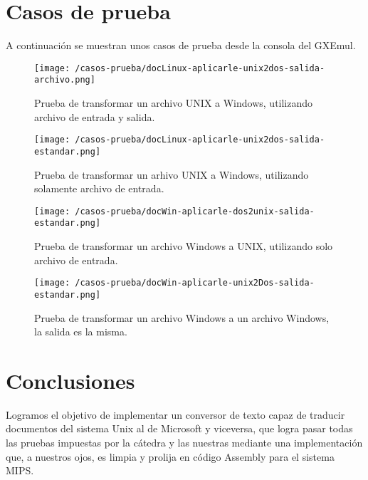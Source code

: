 \documentclass[a4paper]{article}
\begin{document}
\section{Casos de prueba}

A continuación se muestran unos casos de prueba desde la consola del GXEmul.


\begin{figure}[!htp]
\begin{center}
\texttt{[image: /casos-prueba/docLinux-aplicarle-unix2dos-salida-archivo.png]}
\caption{Prueba de transformar un archivo UNIX a Windows, utilizando archivo de entrada y salida.} \label{fig001}
\end{center}
\end{figure}

\begin{figure}[!htp]
\begin{center}
\texttt{[image: /casos-prueba/docLinux-aplicarle-unix2dos-salida-estandar.png]}
\caption{Prueba de transformar un arhivo UNIX a Windows, utilizando solamente archivo de entrada.} \label{fig001}
\end{center}
\end{figure}

\begin{figure}[!htp]
\begin{center}
\texttt{[image: /casos-prueba/docWin-aplicarle-dos2unix-salida-estandar.png]}
\caption{Prueba de transformar un archivo Windows a UNIX, utilizando solo archivo de entrada.} \label{fig001}
\end{center}
\end{figure}

\begin{figure}[!htp]
\begin{center}
\texttt{[image: /casos-prueba/docWin-aplicarle-unix2Dos-salida-estandar.png]}
\caption{Prueba de transformar un archivo Windows a un archivo Windows, la salida es la misma.} \label{fig001}
\end{center}
\end{figure}

\pagebreak


\section{Conclusiones}

Logramos el objetivo de implementar un conversor de texto capaz de traducir documentos del sistema Unix al de Microsoft y viceversa, que logra pasar todas las pruebas impuestas por la cátedra y las nuestras mediante una implementación que, a nuestros ojos, es limpia y prolija en código Assembly para el sistema MIPS. 
\end{document}
